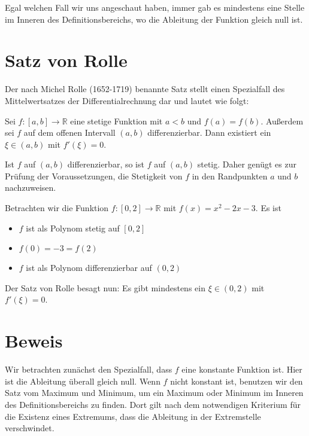 \documentclass[fontsize=9pt,
               parskip=half-,
               DIV=14,
               listof=chapterentry,
               tocflat]{scrbook}
\begin{document}
Egal welchen Fall wir uns angeschaut haben, immer gab es mindestens eine Stelle im Inneren des Definitionsbereichs, wo die Ableitung der Funktion gleich null ist.

\section{Satz von Rolle}

Der nach Michel Rolle (1652-1719) benannte Satz stellt einen Spezialfall des Mittelwertsatzes der Differentialrechnung dar und lautet wie folgt:

\begin{theorem*}
Sei $f:[a,b]\to \mathbb {R} $ eine stetige Funktion mit $a<b$ und $f(a)=f(b)$. Außerdem sei $f$ auf dem offenen Intervall $(a,b)$ differenzierbar. Dann existiert ein $\xi \in (a,b)$ mit $f'(\xi )=0$.

\end{theorem*}

\begin{explanation*}
Ist $f$ auf $(a,b)$ differenzierbar, so ist $f$ auf $(a,b)$ stetig. Daher genügt es zur Prüfung der Voraussetzungen, die Stetigkeit von $f$ in den Randpunkten $a$ und $b$ nachzuweisen.

\end{explanation*}

\begin{example*}
Betrachten wir die Funktion $f:[0,2]\to \mathbb {R} $ mit $f(x)=x^{2}-2x-3$. Es ist

\begin{itemize}
\item $f$ ist als Polynom stetig auf $[0,2]$
\item $f(0)=-3=f(2)$
\item $f$ ist als Polynom differenzierbar auf $(0,2)$
\end{itemize}

Der Satz von Rolle besagt nun: Es gibt mindestens ein $\xi \in (0,2)$ mit $f'(\xi )=0$.

\end{example*}

\section{Beweis}

\begin{proofsummary*}
Wir betrachten zunächst den Spezialfall, dass $f$ eine konstante Funktion ist. Hier ist die Ableitung überall gleich null. Wenn $f$ nicht konstant ist, benutzen wir den Satz vom Maximum und Minimum, um ein Maximum oder Minimum im Inneren des Definitionsbereichs zu finden. Dort gilt nach dem notwendigen Kriterium für die Existenz eines Extremums, dass die Ableitung in der Extremstelle verschwindet.

\end{proofsummary*}
\end{document}
